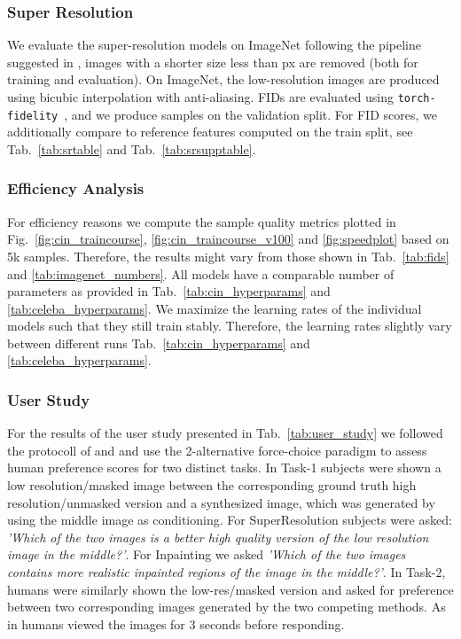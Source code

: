 \documentclass[10pt,twocolumn,letterpaper]{article}
\begin{document}
\subsubsection{Super Resolution}
\label{suppsubsubsec:sr}
We evaluate the super-resolution models on ImageNet following the pipeline suggested in \cite{DBLP:journals/corr/abs-2104-07636}, \ie images 
with a shorter size less than  px are removed (both for training and evaluation). On ImageNet, the low-resolution images are 
produced using bicubic interpolation with anti-aliasing.
FIDs are evaluated using \texttt{torch-fidelity}~\cite{obukhov2020torchfidelity}, 
and we produce samples on the validation split.
For FID scores, we additionally compare to reference features computed on the train split, see Tab.~\ref{tab:srtable} and Tab.~\ref{tab:srsupptable}.


\subsubsection{Efficiency Analysis}
\label{suppsubsubsec:compute}
For efficiency reasons we compute the sample quality metrics plotted in Fig.~\ref{fig:cin_traincourse}, \ref{fig:cin_traincourse_v100} and \ref{fig:speedplot} based on 5k samples. Therefore, the results might vary from those shown in Tab.~\ref{tab:fids} and \ref{tab:imagenet_numbers}. All models have a comparable number of parameters as provided in Tab.~\ref{tab:cin_hyperparams} and \ref{tab:celeba_hyperparams}. We maximize the learning rates of the individual models such that they still train stably. Therefore, the learning rates slightly vary between different runs \cf Tab.~\ref{tab:cin_hyperparams} and \ref{tab:celeba_hyperparams}. 

\subsubsection{User Study}
\label{suppsubsubsec:user_study}
For the results of the user study presented in Tab.~\ref{tab:user_study} we followed the protocoll of \cite{DBLP:journals/corr/abs-2104-07636} and and use the 2-alternative force-choice paradigm to assess human preference scores for two distinct tasks. In Task-1 subjects were shown a low resolution/masked image between the corresponding ground truth high resolution/unmasked version and a synthesized image, which was generated by using the middle image as conditioning. For SuperResolution subjects were asked: \emph{'Which of the two images is a better high quality version of the low resolution image in the middle?'}. For Inpainting we asked \emph{'Which of the two images contains more realistic inpainted regions of the image in the middle?'}. In Task-2, humans were similarly shown the low-res/masked version and asked for preference between two corresponding images generated by the two competing methods. As in \cite{DBLP:journals/corr/abs-2104-07636} humans viewed the images for 3 seconds before responding.
\end{document}
